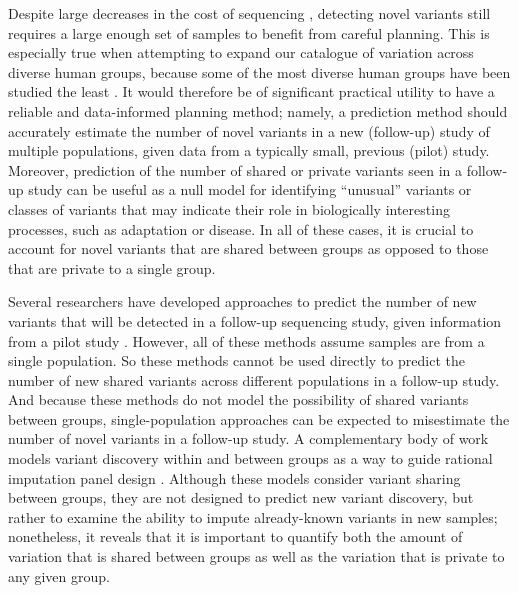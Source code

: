 Despite large decreases in the cost of sequencing \citep{christensen2015assessing, park2016trends, schwarze2018whole}, detecting novel variants still requires a large enough set of samples to benefit from careful planning. This is especially true when attempting to expand our catalogue of variation across diverse human groups, because some of the most diverse human groups have been studied the least \citep{popejoy2016genomics}. It would therefore be of significant practical utility to have a reliable and data-informed planning method; namely, a prediction method should accurately estimate the number of novel variants in a new (follow-up) study of multiple populations, given data from a typically small, previous (pilot) study. Moreover, prediction of the number of shared or private variants seen in a follow-up study can be useful as a null model for identifying ``unusual'' variants or classes of variants that may indicate their role in biologically interesting processes, such as adaptation or disease. In all of these cases, it is crucial to account for novel variants that are shared between groups as opposed to those that are private to a single group.

Several researchers have developed approaches to predict the number of new variants that will be detected in a follow-up sequencing study, given information from a pilot study \citep{Camerlenghi2021, Masoero2022, chakraborty2019using, zou2016quantifying,gravel2014predicting,ionita2009estimating}.  However, all of these methods assume samples are from a single population. So these methods cannot be used directly to predict the number of new shared variants across different populations in a follow-up study.
And because these methods do not model the possibility of shared variants between groups, single-population approaches can be expected to misestimate the number of novel variants in a follow-up study.  A complementary body of work models variant discovery within and between groups as a way to guide rational imputation panel design \citep{huang2013genotype, huang2009genotype, kang2015choosing, jewett2012coalescent, zhang2013genotype}. Although these models consider variant sharing between groups, they are not designed to predict new variant discovery, but rather to examine the ability to impute already-known variants in new samples; nonetheless, it reveals that it is important to quantify both the amount of variation that is shared between groups as well as the variation that is private to any given group. 


